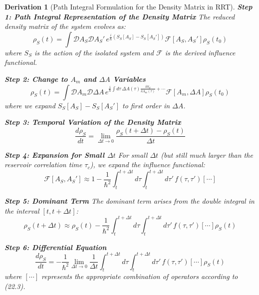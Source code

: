 \documentclass[10pt, a4paper]{article}
\newtheorem{derivation}{Derivation}
\begin{document}
\begin{derivation}[Path Integral Formulation for the Density Matrix in RRT]
\textbf{Step 1: Path Integral Representation of the Density Matrix}
The reduced density matrix of the system evolves as:
\begin{equation}
\rho_S(t) = \int \mathscr{D}A_S \mathscr{D}A_S' \, e^{\frac{i}{\hbar}(S_S[A_S] - S_S[A_S'])} \mathcal{F}[A_S, A_S'] \rho_S(t_0)
\tag{23.1}
\end{equation}
where $S_S$ is the action of the isolated system and $\mathcal{F}$ is the derived influence functional.

\textbf{Step 2: Change to $A_m$ and $\Delta A$ Variables}
\begin{equation}
\rho_S(t) = \int \mathscr{D}A_m \mathscr{D}\Delta A \, e^{\frac{i}{\hbar}\int d\tau \, \Delta A(\tau) \frac{\delta S_S}{\delta A_m(\tau)} + \cdots} \mathcal{F}[A_m, \Delta A] \rho_S(t_0)
\tag{23.2}
\end{equation}
where we expand $S_S[A_S] - S_S[A_S']$ to first order in $\Delta A$.

\textbf{Step 3: Temporal Variation of the Density Matrix}
\begin{equation}
\frac{d\rho_S}{dt} = \lim_{\Delta t \to 0} \frac{\rho_S(t + \Delta t) - \rho_S(t)}{\Delta t}
\tag{23.3}
\end{equation}

\textbf{Step 4: Expansion for Small $\Delta t$}
For small $\Delta t$ (but still much larger than the reservoir correlation time $\tau_c$), we expand the influence functional:
\begin{equation}
\mathcal{F}[A_S, A_S'] \approx 1 - \frac{1}{\hbar^2} \int_t^{t+\Delta t} d\tau \int_t^{t+\Delta t} d\tau' \, f(\tau,\tau') [\cdots]
\tag{23.4}
\end{equation}

\textbf{Step 5: Dominant Term}
The dominant term arises from the double integral in the interval $[t, t+\Delta t]$:
\begin{equation}
\rho_S(t+\Delta t) \approx \rho_S(t) - \frac{1}{\hbar^2} \int_t^{t+\Delta t} d\tau \int_t^{t+\Delta t} d\tau' \, f(\tau,\tau') [\cdots] \rho_S(t)
\tag{23.5}
\end{equation}

\textbf{Step 6: Differential Equation}
\begin{equation}
\frac{d\rho_S}{dt} = -\frac{1}{\hbar^2} \lim_{\Delta t \to 0} \frac{1}{\Delta t} \int_t^{t+\Delta t} d\tau \int_t^{t+\Delta t} d\tau' \, f(\tau,\tau') [\cdots] \rho_S(t)
\tag{23.6}
\end{equation}
where $[\cdots]$ represents the appropriate combination of operators according to (22.3).


\end{derivation}
\end{document}

